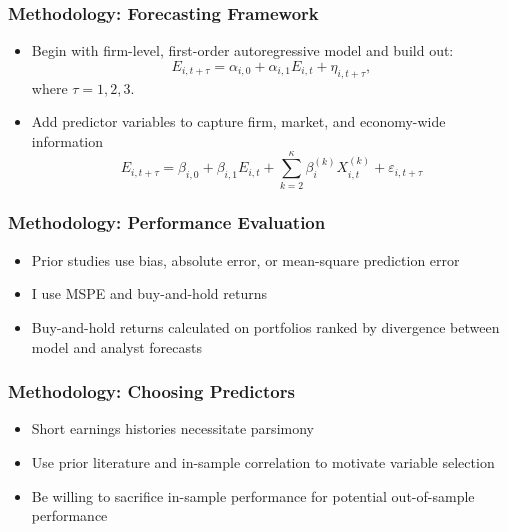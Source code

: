 \documentclass{beamer}
\begin{document}
\begin{frame}
\frametitle{Methodology: Forecasting Framework}
\begin{itemize}
\item Begin with firm-level, first-order autoregressive model and build out:
\begin{equation}
E_{i, t+\tau} = \alpha_{i,0} + \alpha_{i,1} E_{i,t} + \eta_{i,t+\tau},
\end{equation}
where $\tau = 1,2,3$.
\item Add predictor variables to capture firm, market, and economy-wide information
\begin{equation}
E_{i, t+\tau} = \beta_{i,0} + \beta_{i,1} E_{i,t} + \sum_{k=2}^{\kappa} \beta^{(k)}_{i} X^{(k)}_{i, t}  + \varepsilon_{i,t+\tau}
\end{equation}
\end{itemize}
\end{frame}

\begin{frame}
\frametitle{Methodology: Performance Evaluation}
\begin{itemize}
\item Prior studies use bias, absolute error, or mean-square prediction error
\item I use MSPE and buy-and-hold returns
\item Buy-and-hold returns calculated on portfolios ranked by divergence between model and analyst forecasts
\end{itemize}
\end{frame}

\begin{frame}
\frametitle{Methodology: Choosing Predictors}
\begin{itemize}
\item Short earnings histories necessitate parsimony
\item Use prior literature and in-sample correlation to motivate variable selection
\item Be willing to sacrifice in-sample performance for potential out-of-sample performance
\end{itemize}
\end{frame}
\end{document}

